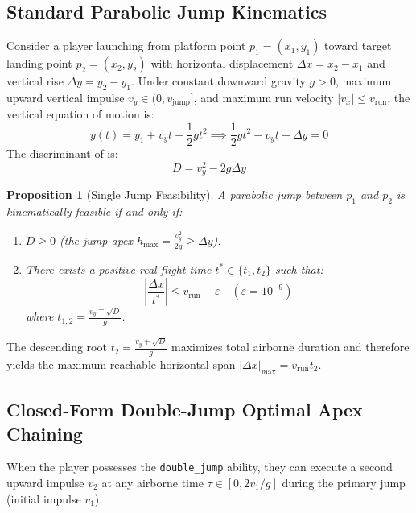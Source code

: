 \documentclass[11pt,a4paper]{report}
\newtheorem{proposition}[theorem]{Proposition}
\theoremstyle{definition}
\theoremstyle{remark}
\begin{document}
\subsection{Standard Parabolic Jump Kinematics}
Consider a player launching from platform point $p_1 = (x_1, y_1)$ toward target landing point $p_2 = (x_2, y_2)$ with horizontal displacement $\Delta x = x_2 - x_1$ and vertical rise $\Delta y = y_2 - y_1$. Under constant downward gravity $g > 0$, maximum upward vertical impulse $v_y \in (0, v_{\text{jump}}]$, and maximum run velocity $|v_x| \le v_{\text{run}}$, the vertical equation of motion is:
\begin{equation}
    y(t) = y_1 + v_y t - \frac{1}{2} g t^2 \implies \frac{1}{2} g t^2 - v_y t + \Delta y = 0
    \label{eq:parabola}
\end{equation}
The discriminant of  is:
\begin{equation}
    D = v_y^2 - 2 g \Delta y
\end{equation}

\begin{proposition}[Single Jump Feasibility]
A parabolic jump between $p_1$ and $p_2$ is kinematically feasible if and only if:
\begin{enumerate}
    \item $D \ge 0$ (the jump apex $h_{\max} = \frac{v_y^2}{2g} \ge \Delta y$).
    \item There exists a positive real flight time $t^* \in \{t_1, t_2\}$ such that:
    \begin{equation}
        \left| \frac{\Delta x}{t^*} \right| \le v_{\text{run}} + \varepsilon \quad (\varepsilon = 10^{-9})
    \end{equation}
    where $t_{1,2} = \frac{v_y \mp \sqrt{D}}{g}$.
\end{enumerate}
\end{proposition}
The descending root $t_2 = \frac{v_y + \sqrt{D}}{g}$ maximizes total airborne duration and therefore yields the maximum reachable horizontal span $|\Delta x|_{\max} = v_{\text{run}} t_2$.

\subsection{Closed-Form Double-Jump Optimal Apex Chaining}
When the player possesses the \texttt{double\_jump} ability, they can execute a second upward impulse $v_2$ at any airborne time $\tau \in [0, 2v_1/g]$ during the primary jump (initial impulse $v_1$).
\end{document}
